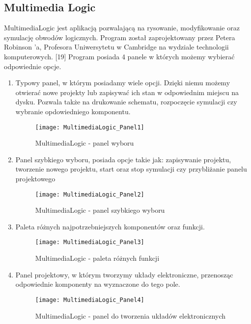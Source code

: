 \documentclass[12pt, a4paper, onside, polish]{article}				%
\begin{document}
\cleardoublepage

\subsection{Multimedia Logic}
\hspace{\parindent}
MultimediaLogic jest aplikacją pozwalającą na rysowanie, modyfikowanie oraz symulację obwodów logicznych.  Program został zaprojektowany przez Petera Robinson ’a, Profesora Uniwersytetu w Cambridge na wydziale technologii komputerowych. [19]  \newline\newline
Program posiada 4 panele w których możemy wybierać odpowiednie opcje.

 \begin{enumerate}
\item Typowy panel, w którym posiadamy wiele opcji. Dzięki niemu możemy otwierać nowe projekty lub zapisywać ich stan w odpowiednim miejscu na dysku. Pozwala także na drukowanie schematu, rozpoczęcie symulacji czy wybranie opdowiedniego komponentu.
  	\begin{figure}[H]
  	  {\centering \texttt{[image: MultimediaLogic\_Panel1]} \caption{MultimediaLogic - panel wyboru}}\vspace{5mm}
  	  \end{figure}
  	  
\item Panel szybkiego wyboru, posiada opcje takie jak: zapisywanie projektu, tworzenie nowego projektu, start oraz stop symulacji czy przybliżanie panelu projektowego
  	\begin{figure}[H]
  	  {\centering \texttt{[image: MultimediaLogic\_Panel2]} \caption{MultimediaLogic - panel szybkiego wyboru}}\vspace{5mm} 
  	 \end{figure}
  	 
  \cleardoublepage 	 
 \item Paleta różnych najpotrzebniejszych komponentów oraz funkcji. 
  	\begin{figure}[H]
  	  {\centering \texttt{[image: MultimediaLogic\_Panel3]} \caption{MultimediaLogic - paleta różnych funkcji}}\vspace{5mm}
  	 \end{figure}
  	 
\cleardoublepage
\item  Panel projektowy, w którym tworzymy układy elektroniczne, przenosząc odpowiednie komponenty na wyznaczone do tego pole.
  	\begin{figure}[H]
  	  {\centering \texttt{[image: MultimediaLogic\_Panel4]} \caption{MultimediaLogic - panel do tworzenia układów elektronicznych}}\vspace{5mm}
  	 \end{figure}
\end {enumerate}
\end{document}
